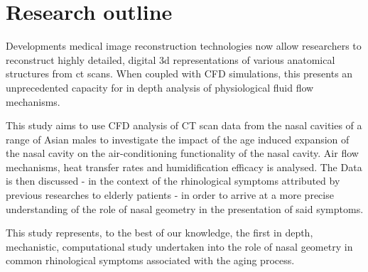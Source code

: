 \section{Research outline}

Developments medical image reconstruction technologies now allow researchers to reconstruct highly detailed, digital 3d representations of various anatomical structures from ct scans. When coupled with CFD simulations, this presents an unprecedented capacity for in depth analysis of physiological fluid flow mechanisms.

This study aims to use CFD analysis of CT scan data from the nasal cavities of a range of Asian males to investigate the impact of the age induced expansion of the nasal cavity on the air-conditioning functionality of the nasal cavity. Air flow mechanisms, heat transfer rates and humidification efficacy is analysed. The Data is then discussed - in the context of the rhinological symptoms attributed by previous researches to elderly patients - in order to arrive at a more precise understanding of the role of nasal geometry in the presentation of said symptoms.

This study represents, to the best of our knowledge, the first in depth, mechanistic, computational study undertaken into the role of nasal geometry in common rhinological symptoms associated with the aging process.
